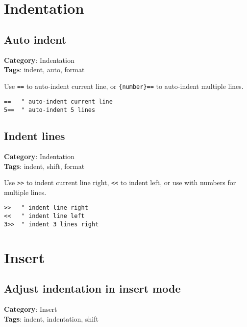 {{{{{{\chapter{Indentation}
\section{Auto indent}

\textbf{Category}: Indentation\\ \textbf{Tags}: indent, auto, format
\vspace{0.5cm}

Use {\footnotesize \Verb§==§} to auto-indent current line, or {\footnotesize \Verb§{number}==§} to auto-indent multiple lines.

\begin{Exa*}{}
\begin{Verbatim}[fontsize=\footnotesize, breaklines, breakanywhere]
==   " auto-indent current line
5==  " auto-indent 5 lines
\end{Verbatim}
\end{Exa*}

\section{Indent lines}

\textbf{Category}: Indentation\\ \textbf{Tags}: indent, shift, format
\vspace{0.5cm}

Use {\footnotesize \Verb§>>§} to indent current line right, {\footnotesize \Verb§<<§} to indent left, or use with numbers for multiple lines.

\begin{Exa*}{}
\begin{Verbatim}[fontsize=\footnotesize, breaklines, breakanywhere]
>>   " indent line right
<<   " indent line left
3>>  " indent 3 lines right
\end{Verbatim}
\end{Exa*}

\chapter{Insert}
\section{Adjust indentation in insert mode}

\textbf{Category}: Insert\\ \textbf{Tags}: indent, indentation, shift
\vspace{0.5cm}

}}}}}}
